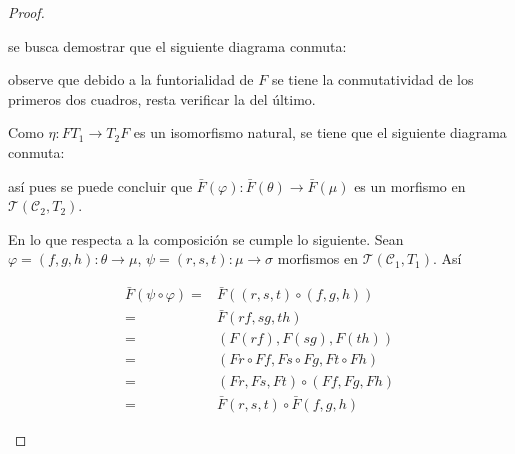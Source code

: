 \documentclass{article}
\newcommand{\cc}{\mathscr{C}}
\begin{document}
\begin{enumerate}
\begin{proof}
\begin{enumerate}
\begin{center}
\end{center}

se busca demostrar que el siguiente diagrama conmuta:

\begin{center}
\end{center}

observe que debido a la funtorialidad de $F$ se tiene la conmutatividad de los primeros dos cuadros, resta verificar la del \'ultimo.

\bigskip

Como $\eta:FT_{1}\to T_{2}F$ es un isomorfismo natural, se tiene que el siguiente diagrama conmuta:

\begin{center}
\end{center}

as\'i pues se puede concluir que $\bar{F}(\varphi):\bar{F}(\theta)\to \bar{F}(\mu)$ es un morfismo en $\mathcal{T}(\cc_{2},T_{2})$.

\bigskip

En lo que respecta a la composici\'on se cumple lo siguiente. Sean $\varphi=(f,g,h):\theta \to \mu$, $\psi=(r,s,t):\mu \to \sigma$ morfismos en $\mathcal{T}(\cc_{1},T_{1})$. As\'i

\begin{align*}
\bar{F}(\psi \circ \varphi) =& \bar{F}((r,s,t)\circ (f,g,h))\\
=& \bar{F}(rf,sg,th)\\
=& (F(rf),F(sg),F(th))\\
=& (Fr\circ Ff,Fs\circ Fg,Ft\circ Fh)\\
=& (Fr,Fs,Ft)\circ (Ff,Fg,Fh)\\
=& \bar{F}(r,s,t)\circ \bar{F}(f,g,h)
\end{align*}


\end{enumerate}
\end{proof}
\end{enumerate}
\end{document}
